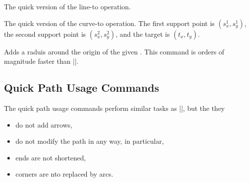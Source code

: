\begin{command}{\pgfpathqlineto{}}
  The quick version of the line-to operation.
\end{command}

\begin{command}{\pgfpathqcurveto{}}
  The quick version of the curve-to operation. The first support point
  is $(s^1_x,s^1_y)$, the second support point is  $(s^2_x,s^2_y)$,
  and the target is $(t_x,t_y)$.
 
\begin{codeexample}[]
\end{codeexample}
\end{command}

\begin{command}{\pgfpathqcircle{}}
  Adds a raduis around the origin of the given . This
  command is orders of magnitude faster than
  ||. 
 
\begin{codeexample}[]
\end{codeexample}
\end{command}



\subsection{Quick Path Usage Commands}

The quick path usage commands perform similar tasks as |\pgfusepath|,
but the they
\begin{itemize}
\item
  do not add arrows,
\item
  do not modify the path in any way, in particular,
\item
  ends are not shortened,
\item
  corners are nto replaced by arcs.
\end{itemize}

